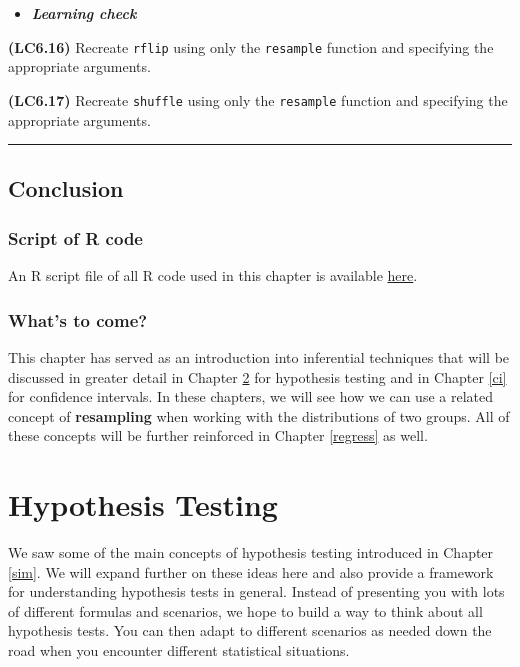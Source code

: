 \documentclass[]{tufte-book}
\let\oldrule=\rule
\renewcommand{\rule}[1]{\oldrule{\linewidth}}
\newenvironment{rmdblock}[1]
  {\begin{shaded*}
  \begin{itemize}
  \renewcommand{\labelitemi}{
    \raisebox{-.7\height}[0pt][0pt]{
    }
  }
  \item
  }
  {
  \end{itemize}
  \end{shaded*}
  }
\newenvironment{learncheck}
  {\begin{rmdblock}{warning}}
  {\end{rmdblock}}
\theoremstyle{definition}
\theoremstyle{definition}
\theoremstyle{remark}
\begin{document}
\begin{learncheck}
\textbf{\emph{Learning check}}
\end{learncheck}

\textbf{(LC6.16)} Recreate \texttt{rflip} using only the
\texttt{resample} function and specifying the appropriate arguments.

\textbf{(LC6.17)} Recreate \texttt{shuffle} using only the
\texttt{resample} function and specifying the appropriate arguments.

\begin{center}\rule{0.5\linewidth}{\linethickness}\end{center}

\section{Conclusion}\label{conclusion-2}

\subsection{Script of R code}\label{script-of-r-code-2}

An R script file of all R code used in this chapter is available
\href{http://ismayc.github.io/moderndiver-book/scripts/06-sim.R}{here}.

\subsection{What's to come?}\label{whats-to-come-3}

This chapter has served as an introduction into inferential techniques
that will be discussed in greater detail in Chapter \ref{hypo} for
hypothesis testing and in Chapter \ref{ci} for confidence intervals. In
these chapters, we will see how we can use a related concept of
\textbf{resampling} when working with the distributions of two groups.
All of these concepts will be further reinforced in Chapter
\ref{regress} as well.

\chapter{Hypothesis Testing}\label{hypo}

We saw some of the main concepts of hypothesis testing introduced in
Chapter \ref{sim}. We will expand further on these ideas here and also
provide a framework for understanding hypothesis tests in general.
Instead of presenting you with lots of different formulas and scenarios,
we hope to build a way to think about all hypothesis tests. You can then
adapt to different scenarios as needed down the road when you encounter
different statistical situations.
\end{document}
